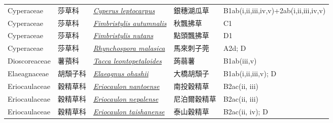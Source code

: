 {\begin{longtable}{p{2.5cm}p{2.5cm}p{4.5cm}p{2.5cm}p{3cm}}
    Cyperaceae & 莎草科 & \href{http://www.theplantlist.org/tpl1.1/search?q=Cyperus+leptocarpus}{\textit{Cyperus leptocarpus} } & 銀穗湖瓜草 & B1ab(i,ii,iii,iv,v)+2ab(i,ii,iii,iv,v) \index{Cyperus@\textit{Cyperus}!leptocarpus@\textit{leptocarpus}}  \index{銀穗湖瓜草} \\
    Cyperaceae & 莎草科 & \href{http://www.theplantlist.org/tpl1.1/search?q=Fimbristylis+autumnalis}{\textit{Fimbristylis autumnalis} } & 秋飄拂草 & C1 \index{Fimbristylis@\textit{Fimbristylis}!autumnalis@\textit{autumnalis}}  \index{秋飄拂草} \\
    Cyperaceae & 莎草科 & \href{http://www.theplantlist.org/tpl1.1/search?q=Fimbristylis+nutans}{\textit{Fimbristylis nutans} } & 點頭飄拂草 & D1 \index{Fimbristylis@\textit{Fimbristylis}!nutans@\textit{nutans}}  \index{點頭飄拂草} \\
    Cyperaceae & 莎草科 & \href{http://www.theplantlist.org/tpl1.1/search?q=Rhynchospora+malasica}{\textit{Rhynchospora malasica} } & 馬來刺子莞 & A2d; D \index{Rhynchospora@\textit{Rhynchospora}!malasica@\textit{malasica}}  \index{馬來刺子莞} \\
    Dioscoreaceae & 薯蕷科 & \href{http://www.theplantlist.org/tpl1.1/search?q=Tacca+leontopetaloides}{\textit{Tacca leontopetaloides} } & 蒟蒻薯 & B1ab(iii,v) \index{Tacca@\textit{Tacca}!leontopetaloides@\textit{leontopetaloides}}  \index{蒟蒻薯} \\
    Elaeagnaceae & 胡頹子科 & \href{http://www.theplantlist.org/tpl1.1/search?q=Elaeagnus+ohashii}{\textit{Elaeagnus ohashii} } & 大橋胡頹子 & B1ab(i,ii,iii,v); D \index{Elaeagnus@\textit{Elaeagnus}!ohashii@\textit{ohashii}}  \index{大橋胡頹子} \\
    Eriocaulaceae & 穀精草科 & \href{http://www.theplantlist.org/tpl1.1/search?q=Eriocaulon+nantoense}{\textit{Eriocaulon nantoense} } & 南投穀精草 & B2ac(ii, iii) \index{Eriocaulon@\textit{Eriocaulon}!nantoense@\textit{nantoense}}  \index{南投穀精草} \\
    Eriocaulaceae & 穀精草科 & \href{http://www.theplantlist.org/tpl1.1/search?q=Eriocaulon+nepalense}{\textit{Eriocaulon nepalense} } & 尼泊爾穀精草 & B2ac(ii, iii) \index{Eriocaulon@\textit{Eriocaulon}!nepalense@\textit{nepalense}}  \index{尼泊爾穀精草} \\
    Eriocaulaceae & 穀精草科 & \href{http://www.theplantlist.org/tpl1.1/search?q=Eriocaulon+taishanense}{\textit{Eriocaulon taishanense} } & 泰山穀精草 & B2ac(ii, iv); D \index{Eriocaulon@\textit{Eriocaulon}!taishanense@\textit{taishanense}}  \index{泰山穀精草} \\

\end{longtable}}
